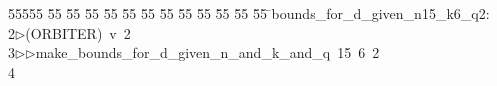 %
%
\begin{tabbing}
55555 \= 55 \= 55 \= 55 \= 55 \= 55 \= 55 \= 55 \= 55 \= 55 \= 55 \= 55 \= 55 \= \>bounds\_for\_d\_given\_n15\_k6\_q2:\\[0pt]
2\>$\triangleright$\>(ORBITER)\ v\ 2\ \\[0pt]
3\>$\triangleright$\>$\triangleright$\>make\_bounds\_for\_d\_given\_n\_and\_k\_and\_q\ 15\ 6\ 2\\[0pt]
4\>\end{tabbing}
